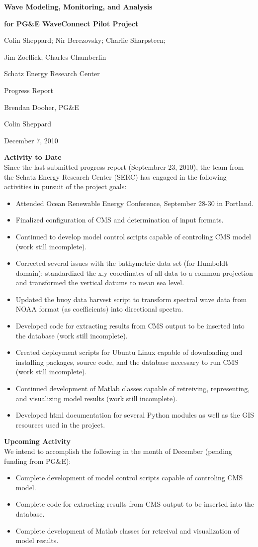 \documentclass[11pt,letterpaper,oneside,reqno]{article}
\begin{document}
\centerline{\Large \bf Wave Modeling, Monitoring, and Analysis} 
\centerline{\Large \bf for PG\&E WaveConnect Pilot Project}
\centerline{Colin Sheppard; Nir Berezovsky; Charlie Sharpsteen;}
\centerline{Jim Zoellick; Charles Chamberlin}
\centerline{Schatz Energy Research Center}
\bigskip
\bigskip

 Progress Report

 Brendan Dooher, PG\&E

 Colin Sheppard

 December 7, 2010 


\textbf{Activity to Date}\\
Since the last submitted progress report (Septembrer 23, 2010), the team from the Schatz Energy Research Center (SERC) has engaged in the following activities in pursuit of the project goals:
\begin{itemize}
\item Attended Ocean Renewable Energy Conference, September 28-30 in Portland.
\item Finalized configuration of CMS and determination of input formats.
\item Continued to develop model control scripts capable of controling CMS model (work still incomplete).
\item Corrected several issues with the bathymetric data set (for Humboldt domain): standardized the x,y coordinates of all data to a common projection and transformed the vertical datums to mean sea level.
\item Updated the buoy data harvest script to transform spectral wave data from NOAA format (as coefficients) into directional spectra.
\item Developed code for extracting results from CMS output to be inserted into the database (work still incomplete).
\item Created deployment scripts for Ubuntu Linux capable of downloading and installing packages, source code, and the database necessary to run CMS (work still incomplete).
\item Continued development of Matlab classes capable of retreiving, representing, and visualizing model results (work still incomplete).
\item Developed html documentation for several Python modules as well as the GIS resources used in the project.
\end{itemize}

\textbf{Upcoming Activity}\\
We intend to accomplish the following in the month of December (pending funding from PG\&E):
\begin{itemize}
\item Complete development of model control scripts capable of controling CMS model.
\item Complete code for extracting results from CMS output to be inserted into the database.
\item Complete development of Matlab classes for retreival and visualization of model results.
\end{itemize}
\end{document}
